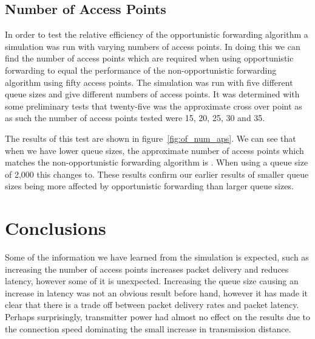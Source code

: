     \subsection{Number of Access Points}\label{data_gathering_performance_number_of_access_points}


        In order to test the relative efficiency of the opportunistic forwarding algorithm a simulation was run with varying numbers of access points. In doing this we can find the number of access points which are required when using opportunistic forwarding to equal the performance of the non-opportunistic forwarding algorithm using fifty access points. The simulation was run with five different queue sizes and give different numbers of access points. It was determined with some preliminary tests that twenty-five was the approximate cross over point as as such the number of access points tested were 15, 20, 25, 30 and 35. 

        The results of this test are shown in figure~\ref{fig:of_num_aps}. We can see that when we have lower queue sizes, the approximate number of access points which matches the non-opportunistic forwarding algorithm is . When using a queue size of 2,000 this changes to. These results confirm our earlier results of smaller queue sizes being more affected by opportunistic forwarding than larger queue sizes. 

    \section{Conclusions}\label{data_gathering_performance_conclusions}


        Some of the information we have learned from the simulation is expected, such as increasing the number of access points increases packet delivery and reduces latency, however some of it is unexpected. Increasing the queue size causing an increase in latency was not an obvious result before hand, however it has made it clear that there is a trade off between packet delivery rates and packet latency. Perhaps surprisingly, transmitter power had almost no effect on the results due to the connection speed dominating the small increase in transmission distance. 

